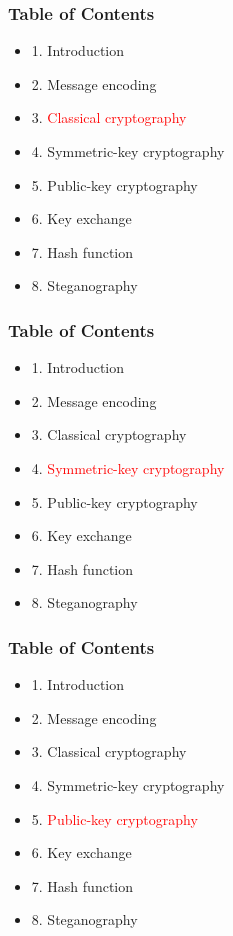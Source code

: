 \documentclass[handout, xcolor=dvipsnames,aspectratio=169]{beamer}
\begin{document}

\begin{frame}
  \centering
  \frametitle{Table of Contents}
  \begin{itemize}
    \item 1. Introduction
    \item 2. Message encoding
    \item 3. \textcolor{red}{Classical cryptography}
    \item 4. Symmetric-key cryptography
    \item 5. Public-key cryptography
    \item 6. Key exchange
    \item 7. Hash function
    \item 8. Steganography
  \end{itemize}  
\end{frame}

\begin{frame}
  \centering
  \frametitle{Table of Contents}
  \begin{itemize}
    \item 1. Introduction
    \item 2. Message encoding
    \item 3. Classical cryptography
    \item 4. \textcolor{red}{Symmetric-key cryptography}
    \item 5. Public-key cryptography
    \item 6. Key exchange
    \item 7. Hash function
    \item 8. Steganography
  \end{itemize}  
\end{frame}

\begin{frame}
  \centering
  \frametitle{Table of Contents}
  \begin{itemize}
    \item 1. Introduction
    \item 2. Message encoding
    \item 3. Classical cryptography
    \item 4. Symmetric-key cryptography
    \item 5. \textcolor{red}{Public-key cryptography}
    \item 6. Key exchange
    \item 7. Hash function
    \item 8. Steganography
  \end{itemize}  
\end{frame}
\end{document}
